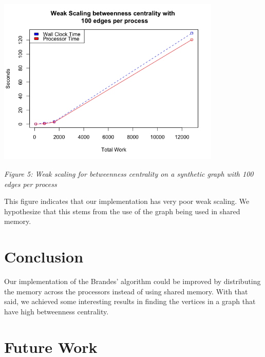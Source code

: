 \documentclass[11pt,a4paper,titlepage]{article}
\begin{document}
\begin{center}
\includegraphics[width=0.8\textwidth]{figures/weak}
\end{center}
\begin{center}
\textit{Figure 5: Weak scaling for betweenness centrality on a synthetic graph
with 100 edges per process}
\end{center}

This figure indicates that our implementation has very poor weak scaling. We
hypothesize that this stems from the use of the graph being used in shared
memory.



\section{Conclusion} %
\label{sec:conclusion}

Our implementation of the Brandes' algorithm could be improved by distributing
the memory across the processors instead of using shared memory. With that said,
we achieved some interesting results in finding the vertices in a graph that
have high betweenness centrality.



\section{Future Work}
\label{sec:future-work}
\end{document}
